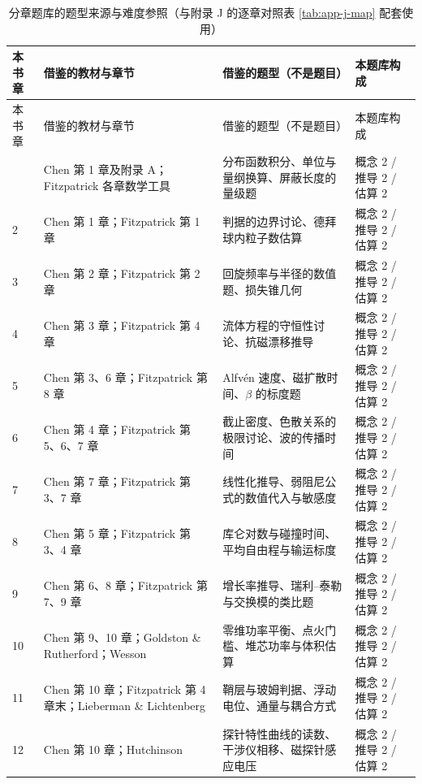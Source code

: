 {\small
\begin{longtable}{@{}p{1.4cm}p{5.3cm}p{5.4cm}p{3.4cm}@{}}
\caption{分章题库的题型来源与难度参照（与附录 J 的逐章对照表 \ref{tab:app-j-map} 配套使用）}\label{tab:app-l-source}\\
\toprule
本书章 & 借鉴的教材与章节 & 借鉴的题型（不是题目） & 本题库构成 \\
\midrule
\endfirsthead
\toprule
本书章 & 借鉴的教材与章节 & 借鉴的题型（不是题目） & 本题库构成 \\
\midrule
\endhead
\bottomrule
\endlastfoot
1 & Chen 第 1 章及附录 A；Fitzpatrick 各章数学工具 & 分布函数积分、单位与量纲换算、屏蔽长度的量级题 & 概念 2 / 推导 2 / 估算 2 \\
2 & Chen 第 1 章；Fitzpatrick 第 1 章 & 判据的边界讨论、德拜球内粒子数估算 & 概念 2 / 推导 2 / 估算 2 \\
3 & Chen 第 2 章；Fitzpatrick 第 2 章 & 回旋频率与半径的数值题、损失锥几何 & 概念 2 / 推导 2 / 估算 2 \\
4 & Chen 第 3 章；Fitzpatrick 第 4 章 & 流体方程的守恒性讨论、抗磁漂移推导 & 概念 2 / 推导 2 / 估算 2 \\
5 & Chen 第 3、6 章；Fitzpatrick 第 8 章 & Alfvén 速度、磁扩散时间、$\beta$ 的标度题 & 概念 2 / 推导 2 / 估算 2 \\
6 & Chen 第 4 章；Fitzpatrick 第 5、6、7 章 & 截止密度、色散关系的极限讨论、波的传播时间 & 概念 2 / 推导 2 / 估算 2 \\
7 & Chen 第 7 章；Fitzpatrick 第 3、7 章 & 线性化推导、弱阻尼公式的数值代入与敏感度 & 概念 2 / 推导 2 / 估算 2 \\
8 & Chen 第 5 章；Fitzpatrick 第 3、4 章 & 库仑对数与碰撞时间、平均自由程与输运标度 & 概念 2 / 推导 2 / 估算 2 \\
9 & Chen 第 6、8 章；Fitzpatrick 第 7、9 章 & 增长率推导、瑞利--泰勒与交换模的类比题 & 概念 2 / 推导 2 / 估算 2 \\
10 & Chen 第 9、10 章；Goldston \& Rutherford；Wesson & 零维功率平衡、点火门槛、堆芯功率与体积估算 & 概念 2 / 推导 2 / 估算 2 \\
11 & Chen 第 10 章；Fitzpatrick 第 4 章末；Lieberman \& Lichtenberg & 鞘层与玻姆判据、浮动电位、通量与耦合方式 & 概念 2 / 推导 2 / 估算 2 \\
12 & Chen 第 10 章；Hutchinson & 探针特性曲线的读数、干涉仪相移、磁探针感应电压 & 概念 2 / 推导 2 / 估算 2 \\
\end{longtable}
}

